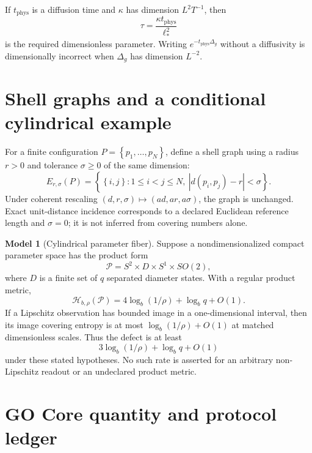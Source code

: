 \documentclass[11pt,a4paper]{article}
\theoremstyle{definition}
\newtheorem{model}[definition]{Model}
\theoremstyle{plain}
\theoremstyle{remark}
\newcommand{\Hmet}{\mathscr{H}}
\newcommand{\abs}[1]{\left\lvert #1\right\rvert}
\newcommand{\set}[1]{\left\{#1\right\}}
\begin{document}
If $t_{\mathrm{phys}}$ is a diffusion time and $\kappa$ has dimension
$L^2T^{-1}$, then
\[
\tau
=
\frac{\kappa t_{\mathrm{phys}}}{\ell_*^2}
\]
is the required dimensionless parameter. Writing
$e^{-t_{\mathrm{phys}}\Delta_g}$ without a diffusivity is dimensionally
incorrect when $\Delta_g$ has dimension $L^{-2}$.

\section{Shell graphs and a conditional cylindrical example}

For a finite configuration $P=\set{p_1,\ldots,p_N}$, define a shell graph
using a radius $r>0$ and tolerance $\sigma\geq0$ of the same dimension:
\[
E_{r,\sigma}(P)
=
\set{\set{i,j}:1\leq i<j\leq N,\ 
\abs{d(p_i,p_j)-r}<\sigma}.
\]
Under coherent rescaling
$(d,r,\sigma)\mapsto(ad,ar,a\sigma)$, the graph is unchanged. Exact
unit-distance incidence corresponds to a declared Euclidean reference
length and $\sigma=0$; it is not inferred from covering numbers alone.

\begin{model}[Cylindrical parameter fiber]
Suppose a nondimensionalized compact parameter space has the product form
\[
\mathcal{P}=S^2\times D\times S^1\times SO(2),
\]
where $D$ is a finite set of $q$ separated diameter states. With a regular
product metric,
\[
\Hmet_{b,\rho}(\mathcal{P})
=
4\log_b(1/\rho)+\log_bq+O(1).
\]
If a Lipschitz observation has bounded image in a one-dimensional interval,
then its image covering entropy is at most
$\log_b(1/\rho)+O(1)$ at matched dimensionless scales. Thus the defect is
at least
\[
3\log_b(1/\rho)+\log_bq+O(1)
\]
under these stated hypotheses. No such rate is asserted for an arbitrary
non-Lipschitz readout or an undeclared product metric.
\end{model}

\section{GO Core quantity and protocol ledger}
\end{document}
